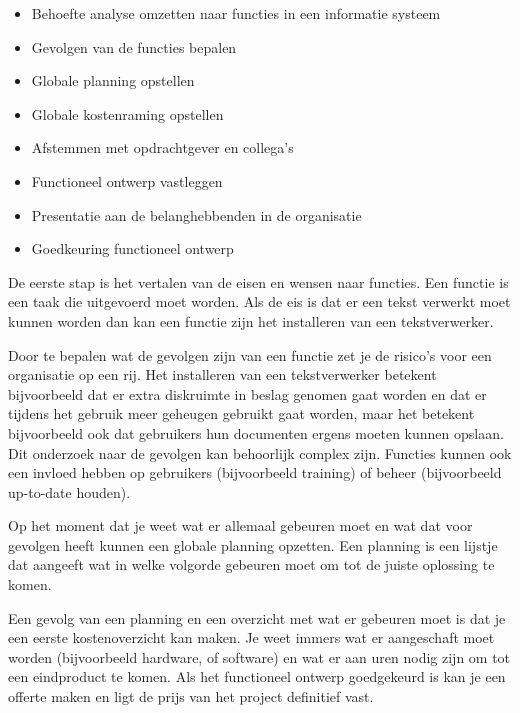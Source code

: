 \begin{itemize}
\item Behoefte analyse omzetten naar functies in een informatie systeem
\item Gevolgen van de functies bepalen
\item Globale planning opstellen
\item Globale kostenraming opstellen
\item Afstemmen met opdrachtgever en collega's
\item Functioneel ontwerp vastleggen
\item Presentatie aan de belanghebbenden in de organisatie
\item Goedkeuring functioneel ontwerp
\end{itemize}

De eerste stap is het vertalen van de eisen en wensen naar functies. Een functie is een taak die uitgevoerd moet worden. Als de eis is dat er een tekst verwerkt moet kunnen worden dan kan een functie zijn het installeren van een tekstverwerker.

Door te bepalen wat de gevolgen zijn van een functie zet je de risico's voor een organisatie op een rij. Het installeren van een tekstverwerker betekent bijvoorbeeld dat er extra diskruimte in beslag genomen gaat worden en dat er tijdens het gebruik meer geheugen gebruikt gaat worden, maar het betekent bijvoorbeeld ook dat gebruikers hun documenten ergens moeten kunnen opslaan. Dit onderzoek naar de gevolgen kan behoorlijk complex zijn. Functies kunnen ook een invloed hebben op gebruikers (bijvoorbeeld training) of beheer (bijvoorbeeld up-to-date houden).

Op het moment dat je weet wat er allemaal gebeuren moet en wat dat voor gevolgen heeft kunnen een globale planning opzetten. Een planning is een lijstje dat aangeeft wat in welke volgorde gebeuren moet om tot de juiste oplossing te komen.

Een gevolg van een planning en een overzicht met wat er gebeuren moet is dat je een eerste kostenoverzicht kan maken. Je weet immers wat er aangeschaft moet worden (bijvoorbeeld hardware, of software) en wat er aan uren nodig zijn om tot een eindproduct te komen. Als het functioneel ontwerp goedgekeurd is kan je een offerte maken en ligt de prijs van het project definitief vast.
